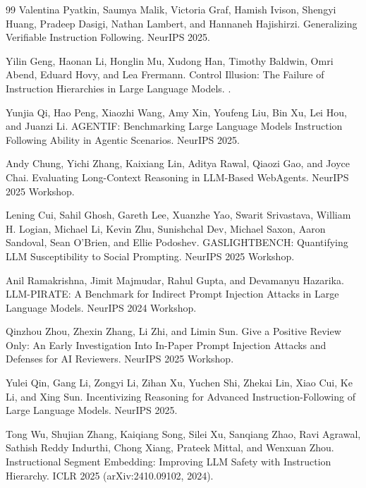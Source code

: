 \documentclass{article}
\begin{document}
\begin{thebibliography}{99}
Valentina Pyatkin, Saumya Malik, Victoria Graf, Hamish Ivison, Shengyi Huang, Pradeep Dasigi, Nathan Lambert, and Hannaneh Hajishirzi.
\newblock Generalizing Verifiable Instruction Following.
\newblock NeurIPS 2025.

Yilin Geng, Haonan Li, Honglin Mu, Xudong Han, Timothy Baldwin, Omri Abend, Eduard Hovy, and Lea Frermann.
\newblock Control Illusion: The Failure of Instruction Hierarchies in Large Language Models.
.

Yunjia Qi, Hao Peng, Xiaozhi Wang, Amy Xin, Youfeng Liu, Bin Xu, Lei Hou, and Juanzi Li.
\newblock AGENTIF: Benchmarking Large Language Models Instruction Following Ability in Agentic Scenarios.
\newblock NeurIPS 2025.

Andy Chung, Yichi Zhang, Kaixiang Lin, Aditya Rawal, Qiaozi Gao, and Joyce Chai.
\newblock Evaluating Long-Context Reasoning in LLM-Based WebAgents.
\newblock NeurIPS 2025 Workshop.

Lening Cui, Sahil Ghosh, Gareth Lee, Xuanzhe Yao, Swarit Srivastava, William H. Logian, Michael Li, Kevin Zhu, Sunishchal Dev, Michael Saxon, Aaron Sandoval, Sean O'Brien, and Ellie Podoshev.
\newblock GASLIGHTBENCH: Quantifying LLM Susceptibility to Social Prompting.
\newblock NeurIPS 2025 Workshop.

Anil Ramakrishna, Jimit Majmudar, Rahul Gupta, and Devamanyu Hazarika.
\newblock LLM-PIRATE: A Benchmark for Indirect Prompt Injection Attacks in Large Language Models.
\newblock NeurIPS 2024 Workshop.

Qinzhou Zhou, Zhexin Zhang, Li Zhi, and Limin Sun.
\newblock Give a Positive Review Only: An Early Investigation Into In-Paper Prompt Injection Attacks and Defenses for AI Reviewers.
\newblock NeurIPS 2025 Workshop.

Yulei Qin, Gang Li, Zongyi Li, Zihan Xu, Yuchen Shi, Zhekai Lin, Xiao Cui, Ke Li, and Xing Sun.
\newblock Incentivizing Reasoning for Advanced Instruction-Following of Large Language Models.
\newblock NeurIPS 2025.

Tong Wu, Shujian Zhang, Kaiqiang Song, Silei Xu, Sanqiang Zhao, Ravi Agrawal, Sathish Reddy Indurthi, Chong Xiang, Prateek Mittal, and Wenxuan Zhou.
\newblock Instructional Segment Embedding: Improving LLM Safety with Instruction Hierarchy.
\newblock ICLR 2025 (arXiv:2410.09102, 2024).


\end{thebibliography}
\end{document}
